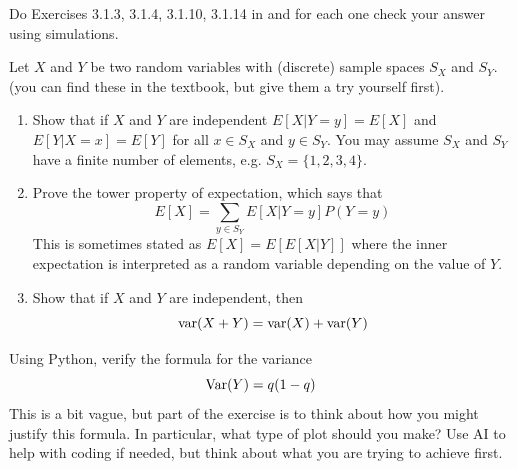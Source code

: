 \begin{exercise}[\ding{111}]
Do Exercises 3.1.3, 3.1.4, 3.1.10, 3.1.14  in  \cite{evans} and for each one check your answer using simulations. 
\end{exercise}

\begin{exercise}
Let $X$ and $Y$ be two random variables with (discrete) sample spaces $S_X$ and $S_Y$.  (you can find these in the textbook, but give them a try yourself first). 
\begin{enumerate}[label=(\alph*)]
\item Show that if $X$ and $Y$ are independent $E[X|Y=y]=E[X]$ and $E[Y|X=x]=E[Y]$ for all $x \in S_X$ and $y \in S_Y$.  You may assume $S_X$ and $S_Y$ have a finite number of elements, e.g. $S_X = \{1,2,3,4\}$. 
\item Prove the tower property of expectation, which says that 
\begin{equation*}
E[X] = \sum_{y \in S_Y}E[X|Y=y]P(Y=y)
\end{equation*} 
This is sometimes stated as $E[X] = E[E[X|Y]]$ where the inner expectation is interpreted as a random variable depending on the value of $Y$. 
\item Show that if $X$ and $Y$ are independent, then 
\begin{equation*}
{\rm var}(X+Y) = {\rm var}(X) + {\rm var}(Y)
\end{equation*} 

\end{enumerate}
\end{exercise}

\begin{exercise}
Using Python, verify the formula for the variance
\begin{equation*}
{\rm Var}(Y) = q(1-q)
\end{equation*}
This is a bit vague, but part of the exercise is to think about how you might justify this formula. In particular, what type of plot should you make? Use AI to help with coding if needed, but think about what you are trying to achieve first. 
\end{exercise}



